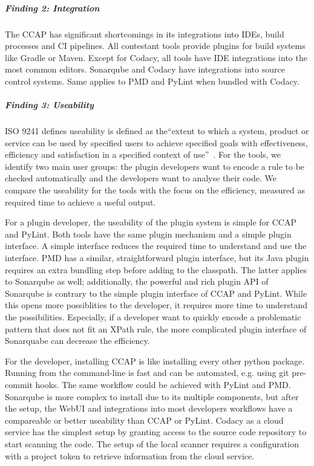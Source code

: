 \subparagraph{Finding 2: Integration}
The CCAP has significant shortcomings in its integrations into IDEs, build processes and CI pipelines. All contestant tools provide plugins for build systems like Gradle or Maven. Except for Codacy, all tools have IDE integrations into the most common editors. Sonarqube and Codacy have integrations into source control systems. Same applies to PMD and PyLint when bundled with Codacy.

\subparagraph{Finding 3: Useability}
ISO 9241 defines useability is defined as the\enquote{extent to which a system, product or service can be used by specified users to achieve specified goals with effectiveness, efficiency and satisfaction in a specified context of use}~\cite{isotc_159sc_4_iso_2018}. For the tools, we identify two main user groups: the plugin developers want to encode a rule to be checked automatically and the developers want to analyse their code. We compare the useability for the tools with the focus on the efficiency, measured as required time to achieve a useful output.

For a plugin developer, the useability of the plugin system is simple for CCAP and PyLint. Both tools have the same plugin mechanism and a simple plugin interface. A simple interface reduces the required time to understand and use the interface.
PMD has a similar, straightforward plugin interface, but its Java plugin requires an extra bundling step before adding to the classpath. The latter applies to Sonarqube as well; additionally, the powerful and rich plugin API of Sonarqube is contrary to the simple plugin interface of CCAP and PyLint. While this opens more possiblities to the developer, it requires more time to understand the possibilities. Especially, if a developer want to quickly encode a problematic pattern that does not fit an XPath rule, the more complicated plugin interface of Sonarquabe can decrease the efficiency. 

For the developer, installing CCAP is like installing every other python package. Running from the command-line is fast and can be automated, e.g. using git pre-commit hooks. The same workflow could be achieved with PyLint and PMD. Sonarqube is more complex to install due to its multiple components, but after the setup, the WebUI and integrations into most developers workflows have a compareable or better useability than CCAP or PyLint. Codacy as a cloud service has the simplest setup by granting access to the source code repository to start scanning the code. The setup of the local scanner requires a configuration with a project token to retrieve information from the cloud service.

